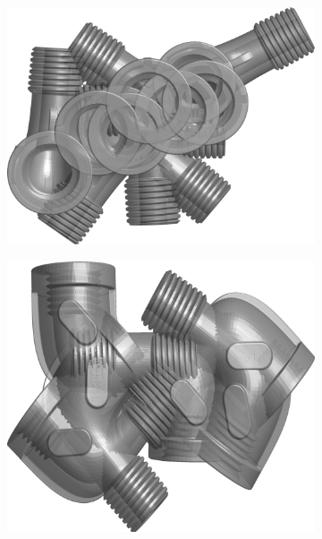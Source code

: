 \begin{figure}[ht]
	\centering
	\begin{subfigure}[b]{0.33\linewidth}
		\includegraphics[width=\linewidth]{fig/reg/cluster1.png}
	\end{subfigure}
	\begin{subfigure}[b]{0.32\linewidth}
		\includegraphics[width=\linewidth]{fig/reg/cluster2.png}
	\end{subfigure}
	\begin{subfigure}[b]{0.30\linewidth}

\end{subfigure}
\end{figure}
